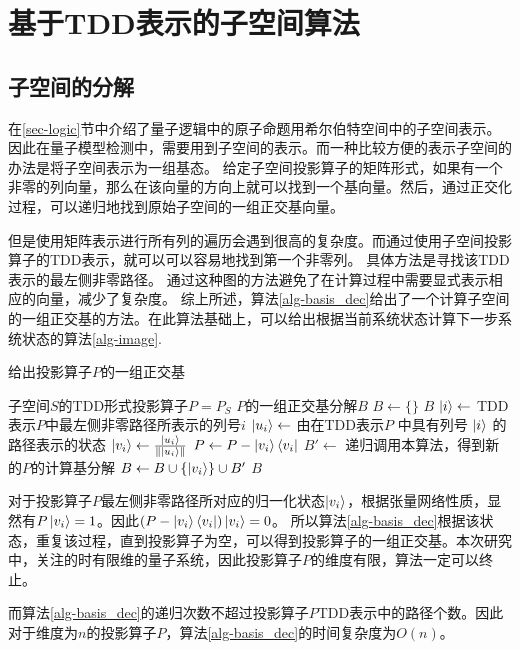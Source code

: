 \section{基于TDD表示的子空间算法}
\subsection{子空间的分解}
在\ref{sec-logic}节中介绍了量子逻辑中的原子命题用希尔伯特空间中的子空间表示。
因此在量子模型检测中，需要用到子空间的表示。而一种比较方便的表示子空间的办法是将子空间表示为一组基态。
给定子空间投影算子的矩阵形式，如果有一个非零的列向量，那么在该向量的方向上就可以找到一个基向量。然后，通过正交化过程，可以递归地找到原始子空间的一组正交基向量。


但是使用矩阵表示进行所有列的遍历会遇到很高的复杂度。而通过使用子空间投影算子的TDD表示，就可以可以容易地找到第一个非零列。
具体方法是寻找该TDD表示的最左侧非零路径。
通过这种图的方法避免了在计算过程中需要显式表示相应的向量，减少了复杂度​​。
综上所述，算法\ref{alg-basis_dec}给出了一个计算子空间的一组正交基的方法。在此算法基础上，可以给出根据当前系统状态计算下一步系统状态的算法\ref{alg-image}.
\begin{algorithm}
\caption{给出投影算子$P$的一组正交基}
\label{alg-basis_dec} 
\begin{algorithmic}[1]
    \Require 子空间$S$的TDD形式投影算子$P=P_S$ 
    \Ensure $P$的一组正交基分解$B$
    \State $B\gets \{\}$
        \Return \(B\)
    \Else
        \State \(\ket{i} \gets\) TDD表示\(P\)中最左侧非零路径所表示的列号\(i\)
        \State \(\ket{u_i}\gets\) 由在TDD表示\(P\) 中具有列号 \(\ket{i}\) 的路径表示的状态
        \State \(\ket{v_i} \gets \frac{\ket{u_i}}{\|\ket{u_i}\|}\)
        \State \(P \gets P - \ket{v_i}\bra{v_i}\)
        \State \(B' \gets \) 递归调用本算法，得到新的$P$的计算基分解
        \State \(B \gets B \cup \{\ket{v_i}\} \cup B'\)
    \EndIf
    \State \Return \(B\)
\end{algorithmic}
\end{algorithm}
对于投影算子$P$最左侧非零路径所对应的归一化状态\(\ket{v_i}\)，根据张量网络性质，显然有\(P\ket{v_i}=1\)。因此\((P - \ket{v_i}\bra{v_i})\ket{v_i}=0\)。
所以算法\ref{alg-basis_dec}根据该状态，重复该过程，直到投影算子为空，可以得到投影算子的一组正交基。本次研究中，关注的时有限维的量子系统，因此投影算子$P$的维度有限，算法一定可以终止。

而算法\ref{alg-basis_dec}的递归次数不超过投影算子$P$TDD表示中的路径个数。因此对于维度为$n$的投影算子$P$，算法\ref{alg-basis_dec}的时间复杂度为$O(n)$。


